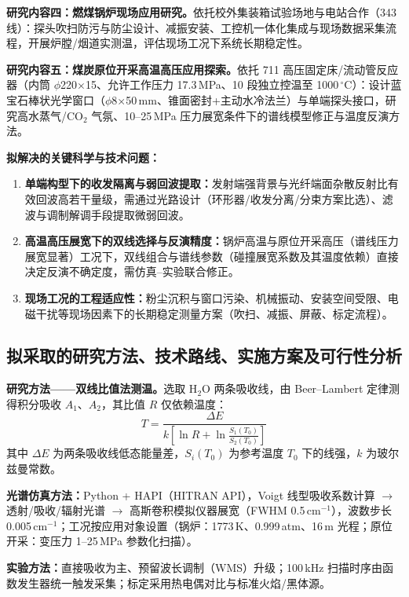 \documentclass[12pt,a4paper]{article}
\begin{document}
\textbf{研究内容四：燃煤锅炉现场应用研究。}依托校外集装箱试验场地与电站合作（343 线）：探头吹扫防污与防尘设计、减振安装、工控机一体化集成与现场数据采集流程，开展炉膛/烟道实测温，评估现场工况下系统长期稳定性。

\textbf{研究内容五：煤炭原位开采高温高压应用探索。}依托 711 高压固定床/流动管反应器（内筒 $\phi$220$\times$15、允许工作压力 17.3\,MPa、10 段独立控温至 1000\,$^\circ$C）：设计蓝宝石棒状光学窗口（$\phi$8$\times$50\,mm、锥面密封+主动水冷法兰）与单端探头接口，研究高水蒸气/CO$_2$ 气氛、10--25\,MPa 压力展宽条件下的谱线模型修正与温度反演方法。

\textbf{拟解决的关键科学与技术问题：}
\begin{enumerate}
  \item \textbf{单端构型下的收发隔离与弱回波提取：}发射端强背景与光纤端面杂散反射比有效回波高若干量级，需通过光路设计（环形器/收发分离/分束方案比选）、滤波与调制解调手段提取微弱回波。
  \item \textbf{高温高压展宽下的双线选择与反演精度：}锅炉高温与原位开采高压（谱线压力展宽显著）工况下，双线组合与谱线参数（碰撞展宽系数及其温度依赖）直接决定反演不确定度，需仿真--实验联合修正。
  \item \textbf{现场工况的工程适应性：}粉尘沉积与窗口污染、机械振动、安装空间受限、电磁干扰等现场因素下的长期稳定测量方案（吹扫、减振、屏蔽、标定流程）。
\end{enumerate}

\subsection{拟采取的研究方法、技术路线、实施方案及可行性分析}

\textbf{研究方法——双线比值法测温。}选取 H$_2$O 两条吸收线，由 Beer--Lambert 定律测得积分吸收 $A_1$、$A_2$，其比值 $R$ 仅依赖温度：
\begin{equation}
  T = \frac{\Delta E}{k\left[\ln R + \ln\frac{S_1(T_0)}{S_2(T_0)}\right]}
\end{equation}
其中 $\Delta E$ 为两条吸收线低态能量差，$S_i(T_0)$ 为参考温度 $T_0$ 下的线强，$k$ 为玻尔兹曼常数。

\textbf{光谱仿真方法：}Python + HAPI（HITRAN API），Voigt 线型吸收系数计算 $\rightarrow$ 透射/吸收/辐射光谱 $\rightarrow$ 高斯卷积模拟仪器展宽（FWHM 0.5\,cm$^{-1}$），波数步长 0.005\,cm$^{-1}$；工况按应用对象设置（锅炉：1773\,K、0.999\,atm、16\,m 光程；原位开采：变压力 1--25\,MPa 参数化扫描）。

\textbf{实验方法：}直接吸收为主、预留波长调制（WMS）升级；100\,kHz 扫描时序由函数发生器统一触发采集；标定采用热电偶对比与标准火焰/黑体源。
\end{document}
